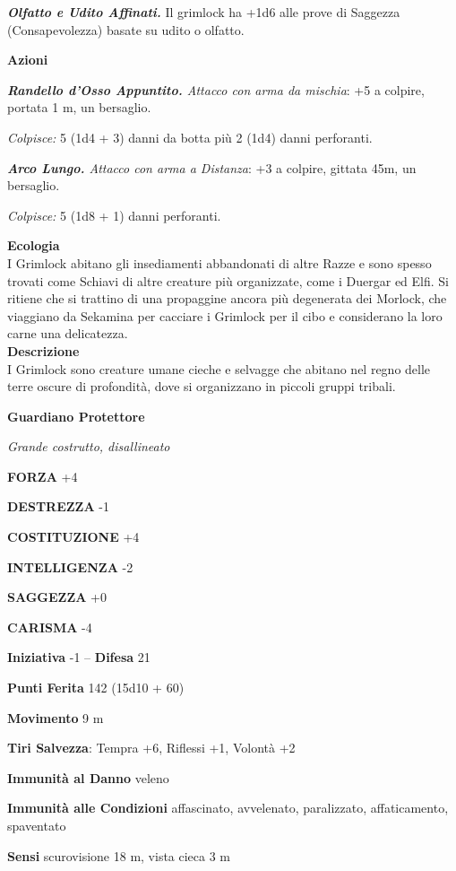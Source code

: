 \begin{multicols}{2}
	\textit{\textbf{Olfatto e Udito Affinati.}} Il grimlock ha +1d6 alle prove di Saggezza (Consapevolezza) basate su udito o olfatto.

	\textbf{Azioni}

	\textit{\textbf{Randello d'Osso Appuntito.} Attacco con arma da mischia}: +5 a colpire, portata 1 m, un bersaglio.

	\textit{Colpisce:} 5 (1d4 + 3) danni da botta più 2 (1d4) danni perforanti.

	\textit{\textbf{Arco Lungo.} Attacco con arma a Distanza}: +3 a colpire, gittata 45m, un bersaglio.

	\textit{Colpisce:} 5 (1d8 + 1) danni perforanti.

	\textbf{Ecologia}\\
	I Grimlock abitano gli insediamenti abbandonati di altre Razze e sono spesso trovati come Schiavi di altre creature più organizzate, come i Duergar ed Elfi. Si ritiene che si trattino di una propaggine ancora più degenerata dei Morlock, che viaggiano da Sekamina per cacciare i Grimlock per il cibo e considerano la loro carne una delicatezza.\\
	\textbf{Descrizione}\\
	I Grimlock sono creature umane cieche e selvagge che abitano nel regno delle terre oscure di profondità, dove si organizzano in piccoli gruppi tribali.

	\medskip{}\textbf{Guardiano Protettore}

	\textit{Grande costrutto, disallineato}

	\textbf{FORZA} +4

	\textbf{DESTREZZA} -1

	\textbf{COSTITUZIONE} +4

	\textbf{INTELLIGENZA} -2

	\textbf{SAGGEZZA} +0

	\textbf{CARISMA} -4

	\textbf{Iniziativa} -1 -- \textbf{Difesa} 21

	\textbf{Punti Ferita} 142 (15d10 + 60)

	\textbf{Movimento} 9 m

	\textbf{Tiri Salvezza}: Tempra +6, Riflessi +1, Volontà +2

	\textbf{Immunità al Danno} veleno

	\textbf{Immunità alle Condizioni} affascinato, avvelenato, paralizzato, affaticamento, spaventato

	\textbf{Sensi} scurovisione 18 m, vista cieca 3 m


\end{multicols}
